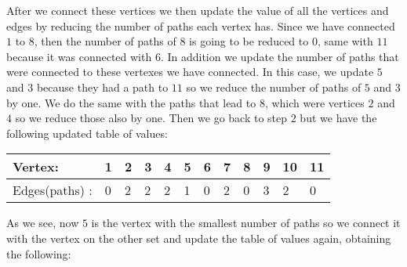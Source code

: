 \documentclass[12pt]{article} \setlength{\oddsidemargin}{0in}
\begin{document}
\begin{enumerate}
\begin{table}[H]
\end{table}

After we connect these vertices we then update the value of all the vertices and edges by reducing the number of paths each vertex has. Since we have connected $1$ to $8$, then the number of paths of 8 is going to be reduced to 0, same with $11$ because it was connected with $6$. In addition we update the number of paths that were connected to these vertexes we have connected. In this case, we update $5$ and $3$ because they had a path to $11$ so we reduce the number of paths of $5$  and $3$ by one. We do the same with the paths that lead to $8$, which were vertices $2$ and $4$ so we reduce those also by one. Then we go back to step $2$ but we have the following updated table of values:

\begin{table}[H]
\centering
\begin{tabular}{|l|l|l|l|l|l|l|l|l|l|l|l|}
\hline
Vertex:     & 1 & 2 & 3 & 4 & 5 & 6 & 7 & 8 & 9 & 10 & 11 \\ \hline
Edges(paths) : & 0 & 2 & 2 & 2 & 1 & 0 & 2 & 0  & 3 & 2  & 0  \\ \hline
\end{tabular}
\end{table}

As we see, now $5$ is the vertex with the smallest number of paths so we connect it with the vertex on the other set and update the table of values again, obtaining the following: 

\begin{table}[H]
\centering
{}
\end{table}
\end{enumerate}
\end{document}
